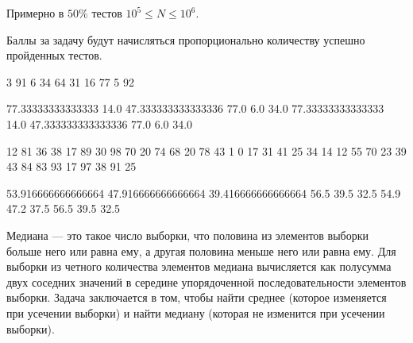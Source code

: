 Примерно в $ 50\% $ тестов $ 10^5 \leq N \leq 10^6$.

Баллы за задачу будут начисляться пропорционально количеству успешно пройденных тестов.


\begin{myverbbox}[\small]{\vinput}
    3
    91 6 34
    64 31 16
    77 5 92
\end{myverbbox}

\begin{myverbbox}[\small]{\voutput}
    77.33333333333333 14.0 47.333333333333336
    77.0 6.0 34.0
    77.33333333333333 14.0 47.333333333333336
    77.0 6.0 34.0
\end{myverbbox}


\begin{myverbbox}[\small]{\vinput}
    12
    81 36 38
    17 89 30
    98 70 20
    74 68 20
    78 43 1
    0 17 31
    41 25 34
    14 12 55
    70 23 39
    43 84 83
    93 17 97
    38 91 25
\end{myverbbox}

\begin{myverbbox}[\small]{\voutput}
    53.916666666666664 47.916666666666664 39.416666666666664
    56.5 39.5 32.5
    54.9 47.2 37.5
    56.5 39.5 32.5
\end{myverbbox}




\solutionSection
Медиана — это такое число выборки, что половина из элементов выборки больше него или равна ему, а другая половина меньше него или равна ему. Для выборки из четного количества элементов медиана вычисляется как полусумма двух соседних значений в середине упорядоченной последовательности элементов выборки. Задача заключается в том, чтобы найти среднее (которое изменяется при усечении выборки) и найти медиану (которая не изменится при усечении выборки).

